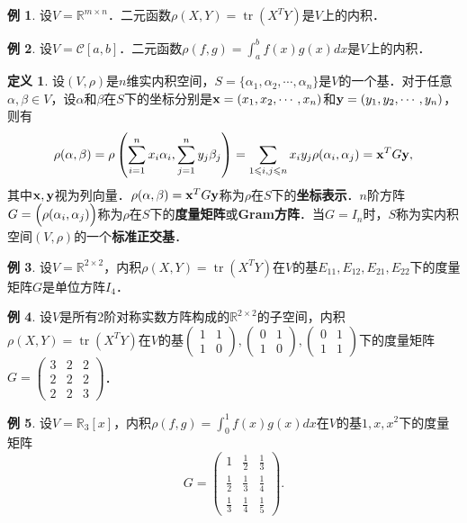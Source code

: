 \documentclass[a4paper,fontset=windows]{ctexbook}
\theoremstyle{definition}
\newtheorem{definition}{定义}[chapter]
\newtheorem{example}{例}[chapter]
\DeclareMathOperator{\tr}{tr}
\renewcommand{\le}{\leqslant}
\begin{document}
\begin{example}
设$V=\mathbb{R}^{m\times n}$．二元函数$\rho(X,Y)=\tr(X^TY)$是$V$上的内积．
\end{example}

\begin{example}
设$V=\mathscr{C}[a,b]$．二元函数$\rho(f,g)=\int_a^bf(x)g(x)dx$是$V$上的内积．
\end{example}

\begin{definition}
设$(V,\rho)$是$n$维实内积空间，$S=\{\alpha_1,\alpha_2,\cdots,\alpha_n\}$是$V$的一个基．对于任意$\alpha,\beta\in V$，设$\alpha$和$\beta$在$S$下的坐标分别是${\bf x}=(x_1,x_2,\cdots,x_n)$和${\bf y}=(y_1,y_2,\cdots,y_n)$，则有
$$\rho(\alpha,\beta)=\rho\left(\sum_{i=1}^nx_i\alpha_i,\sum_{j=1}^ny_j\beta_j\right)=\sum_{1\le i,j\le n}x_iy_j\rho(\alpha_i,\alpha_j)={\bf x}^TG{\bf y},$$
其中${\bf x,y}$视为列向量．$\rho(\alpha,\beta)={\bf x}^TG{\bf y}$称为$\rho$在$S$下的{\bf 坐标表示}．$n$阶方阵$G=\Bigl(\rho(\alpha_i,\alpha_j)\Bigr)$称为$\rho$在$S$下的{\bf 度量矩阵}或{\bf Gram方阵}．当$G=I_n$时，$S$称为实内积空间$(V,\rho)$的一个{\bf 标准正交基}．
\end{definition}

\begin{example}
设$V=\mathbb{R}^{2\times 2}$，内积$\rho(X,Y)=\tr(X^TY)$在$V$的基$E_{11},E_{12},E_{21},E_{22}$下的度量矩阵$G$是单位方阵$I_4$．
\end{example}

\begin{example}\label{ex10.5}
设$V$是所有2阶对称实数方阵构成的$\mathbb{R}^{2\times 2}$的子空间，内积$\rho(X,Y)=\tr(X^TY)$在$V$的基$\begin{pmatrix}1&1 \\ 1&0\end{pmatrix},\begin{pmatrix}0&1 \\ 1&0\end{pmatrix},\begin{pmatrix}0&1 \\ 1&1\end{pmatrix}$下的度量矩阵$G=\begin{pmatrix}3&2&2 \\ 2&2&2 \\ 2&2&3\end{pmatrix}$．
\end{example}

\begin{example}\label{ex10.6}
设$V=\mathbb{R}_3[x]$，内积$\rho(f,g)=\int_0^1f(x)g(x)dx$在$V$的基$1,x,x^2$下的度量矩阵
$$G=\begin{pmatrix}1&\frac{1}{2}&\frac{1}{3} \\ \frac{1}{2}&\frac{1}{3}&\frac{1}{4} \\ \frac{1}{3}&\frac{1}{4}&\frac{1}{5}\end{pmatrix}.$$
\end{example}
\end{document}
